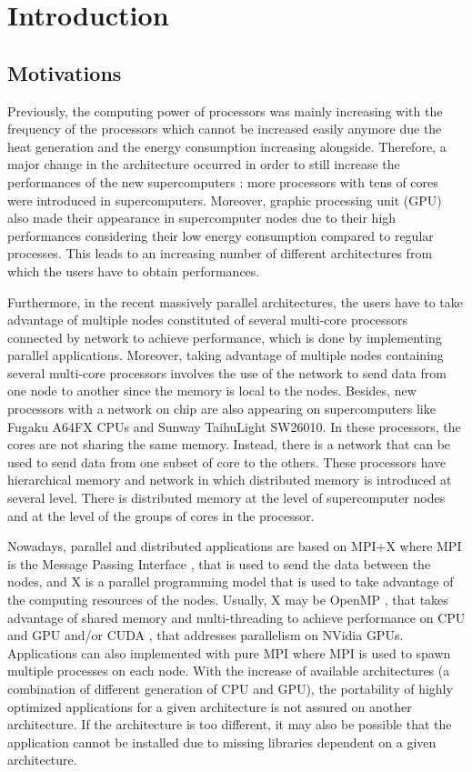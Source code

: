 \chapter{Introduction}

\section{Motivations}
Previously, the computing power of processors was mainly increasing with the frequency of the processors which cannot be increased easily anymore due the heat generation and the energy consumption increasing alongside.
Therefore, a major change in the architecture occurred in order to still increase the performances of the new supercomputers : more processors with tens of cores were introduced in supercomputers.
Moreover, graphic processing unit (GPU) also made their appearance in supercomputer nodes due to their high performances considering their low energy consumption compared to regular processes.
This leads to an increasing number of different architectures from which the users have to obtain performances.

Furthermore, in the recent massively parallel architectures, the users have to take advantage of multiple nodes constituted of several multi-core processors connected by network to achieve performance, which is done by implementing parallel applications.
Moreover, taking advantage of multiple nodes containing several multi-core processors involves the use of the network to send data from one node to another since the memory is local to the nodes.
Besides, new processors with a network on chip are also appearing on supercomputers like Fugaku A64FX CPUs and Sunway TaihuLight SW26010.
In these processors, the cores are not sharing the same memory.
Instead, there is a network that can be used to send data from one subset of core to the others.
These processors have hierarchical memory and network in which distributed memory is introduced at several level.
There is distributed memory at the level of supercomputer nodes and at the level of the groups of cores in the processor.

Nowadays, parallel and distributed applications are based on MPI+X where MPI is the Message Passing Interface \cite{MPIForum}, that is used to send the data between the nodes, and X is a parallel programming model that is used to take advantage of the computing resources of the nodes.
Usually, X may be OpenMP \cite{DaguM1998}, that takes advantage of shared memory and multi-threading to achieve performance on CPU and GPU and/or CUDA \cite{Shane2012}, that addresses parallelism on NVidia GPUs.
Applications can also implemented with pure MPI where MPI is used to spawn multiple processes on each node.
With the increase of available architectures (a combination of different generation of CPU and GPU), the portability of highly optimized applications for a given architecture is not assured on another architecture.
If the architecture is too different, it may also be possible that the application cannot be installed due to missing libraries dependent on a given architecture.

